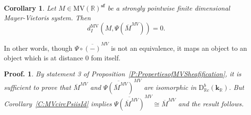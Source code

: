 \documentclass[a4paper, english, 11pt]{article}
\newcommand{\kk}[0]{\textbf{k}}
\newcommand{\0}{\vec{0}}
\newcommand{\R}[0]{\mathbb{R}}
\newcommand{\D}[0]{\text{D}}
\newcommand{\s}{\textbf{sf}}
\newtheorem*{pf}{Proof.} }
\newtheorem{cor}[prop]{Corollary}
\begin{document}
\begin{cor}\label{C:MVdisO}
 Let $M\in \mbox{MV}(\R)^\s$ be a strongly pointwise finite dimensional Mayer-Vietoris system. Then 
 $$d_I^{\text{MV}}(M, \Psi ( \overline{M}^{MV})) = 0. $$
\end{cor}
In other words, though $\Psi \circ \overline{(-)}^{MV}$ is not an equivalence, it maps an object to an object which is at distance $0$ fom itself.
\begin{pf}
 By statement 3 of Proposition~\ref{P:PropertiesofMVSheafification}, it is sufficient to prove that $\overline{M}^{MV}$ and $\overline{\Psi(\overline{M}^{MV})}^{MV}$ are isomorphic in $\D^b_{\R c}(\kk_\R)$. But Corollary~\ref{C:MVcircPsiisId} implies  $\overline{\Psi(\overline{M}^{MV})}^{MV} \cong \overline{M}^{MV}$ and the result follows.
\end{pf}
\end{document}
